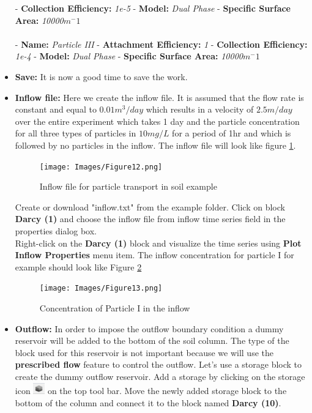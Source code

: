 \begin{itemize}
- \textbf{Collection Efficiency: }\textit{1e-5}
- \textbf{Model: }\textit{Dual Phase}
- \textbf{Specific Surface Area: }\textit{10000$m^-1$}
\\\\
- \textbf{Name: }\textit{Particle III} 
- \textbf{Attachment Efficiency: }\textit{1}
- \textbf{Collection Efficiency: }\textit{1e-4}
- \textbf{Model: }\textit{Dual Phase}
- \textbf{Specific Surface Area: }\textit{10000$m^-1$}
\item \textbf{Save: } It is now a good time to save the work. 
\item \textbf{Inflow file: } Here we create the inflow file. It is assumed that the flow rate is constant and equal to $0.01m^3/day$ which results in a velocity of $2.5m/day$ over the entire experiment which takes 1 day and the particle concentration for all three types of particles in $10mg/L$ for a period of 1hr and which is followed by no particles in the inflow. The inflow file will look like figure \ref{fig:12}. 
\begin{figure}[!ht]\label{fig:12}
\begin{center}
\texttt{[image: Images/Figure12.png]} \\
\caption{Inflow file for particle transport in soil example} 
\end{center}
\end{figure}
Create or download "inflow.txt" from the example folder. Click on block \textbf{Darcy (1)} and choose the inflow file from inflow time series field in the properties dialog box. \\
Right-click on the \textbf{Darcy (1)} block and visualize the time series using \textbf{Plot Inflow Properties} menu item. The inflow concentration for particle I for example should look like Figure \ref{fig:13}
\begin{figure}[!ht]\label{fig:13}
\begin{center}
\texttt{[image: Images/Figure13.png]} \\
\caption{Concentration of Particle I in the inflow} 
\end{center}
\end{figure}
\item \textbf{Outflow: } In order to impose the outflow boundary condition a dummy reservoir will be added to the bottom of the soil column. The type of the block used for this reservoir is not important because we will use the \textbf{prescribed flow} feature to control the outflow. Let's use a storage block to create the dummy outflow reservoir. Add a storage by clicking on the storage icon \includegraphics[width=0.5cm]{Icons/storage_icon.png} on the top tool bar. Move the newly added storage block to the bottom of the column and connect it to the block named \textbf{Darcy (10)}. \\

\end{itemize}
